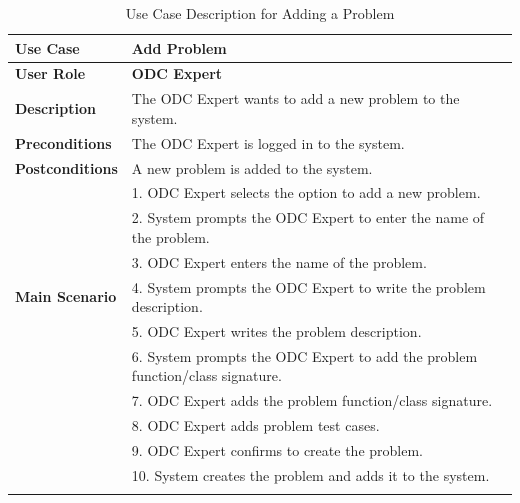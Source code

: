 \normalsize
\begin{longtable}{|p{3cm}|p{12cm}|}
  \hline
  \rowcolor{green!20} \textbf{Use Case}   & \textbf{Add Problem}                                                          \\ \hline
  \textbf{User Role}                      & \textbf{ODC Expert}                                                           \\ \hline
  \textbf{Description}                    & The ODC Expert wants to add a new problem to the system.                      \\ \hline
  \textbf{Preconditions}                  & The ODC Expert is logged in to the system.                                    \\ \hline
  \textbf{Postconditions}                 & A new problem is added to the system.                                         \\ \hline
  \multirow{7}{*}{\textbf{Main Scenario}} & 1. ODC Expert selects the option to add a new problem.                        \\ \cline{2-2}
                                          & 2. System prompts the ODC Expert to enter the name of the problem.            \\ \cline{2-2}
                                          & 3. ODC Expert enters the name of the problem.                                 \\ \cline{2-2}
                                          & 4. System prompts the ODC Expert to write the problem description.            \\ \cline{2-2}
                                          & 5. ODC Expert writes the problem description.                                 \\ \cline{2-2}
                                          & 6. System prompts the ODC Expert to add the problem function/class signature. \\ \cline{2-2}
                                          & 7. ODC Expert adds the problem function/class signature.                      \\ \cline{2-2}
                                          & 8. ODC Expert adds problem test cases.                                        \\ \cline{2-2}
                                          & 9. ODC Expert confirms to create the problem.                                 \\ \cline{2-2}
                                          & 10. System creates the problem and adds it to the system.                     \\ \hline
  \caption{Use Case Description for Adding a Problem}\label{tab:add_problem_use_case}
\end{longtable}

